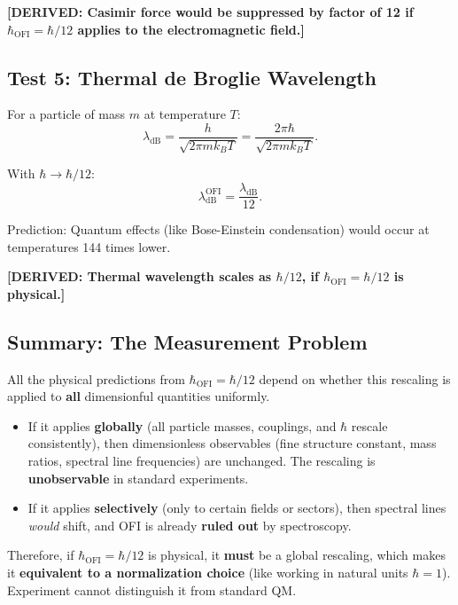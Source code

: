 \documentclass[12pt]{article}
\theoremstyle{definition}
\newcommand{\DERIVED}[1]{\textcolor{derivedcolor}{\textbf{[DERIVED: #1]}}}
\begin{document}
\DERIVED{Casimir force would be suppressed by factor of 12 if $\hbar_{\mathrm{OFI}} = \hbar/12$
applies to the electromagnetic field.}

\subsection{Test 5: Thermal de Broglie Wavelength}

For a particle of mass $m$ at temperature $T$:
\begin{equation}
  \lambda_{\mathrm{dB}} = \frac{h}{\sqrt{2\pi m k_B T}} = \frac{2\pi\hbar}{\sqrt{2\pi m k_B T}}.
\end{equation}

With $\hbar \to \hbar/12$:
\begin{equation}
  \lambda_{\mathrm{dB}}^{\mathrm{OFI}} = \frac{\lambda_{\mathrm{dB}}}{12}.
\end{equation}

Prediction: Quantum effects (like Bose-Einstein condensation) would occur at
temperatures 144 times lower.

\DERIVED{Thermal wavelength scales as $\hbar/12$, if $\hbar_{\mathrm{OFI}} = \hbar/12$ is
physical.}

\subsection{Summary: The Measurement Problem}

\begin{tcolorbox}[warningbox, title=The Central Problem]
All the physical predictions from $\hbar_{\mathrm{OFI}} = \hbar/12$ depend on whether
this rescaling is applied to \textbf{all} dimensionful quantities uniformly.

\begin{itemize}
  \item If it applies \textbf{globally} (all particle masses, couplings, and $\hbar$ rescale
    consistently), then dimensionless observables (fine structure constant, mass ratios,
    spectral line frequencies) are unchanged. The rescaling is \textbf{unobservable} in
    standard experiments.

  \item If it applies \textbf{selectively} (only to certain fields or sectors), then
    spectral lines \textit{would} shift, and OFI is already \textbf{ruled out} by
    spectroscopy.
\end{itemize}

Therefore, if $\hbar_{\mathrm{OFI}} = \hbar/12$ is physical, it \textbf{must} be a global
rescaling, which makes it \textbf{equivalent to a normalization choice} (like working in
natural units $\hbar = 1$). Experiment cannot distinguish it from standard QM.
\end{tcolorbox}
\end{document}
